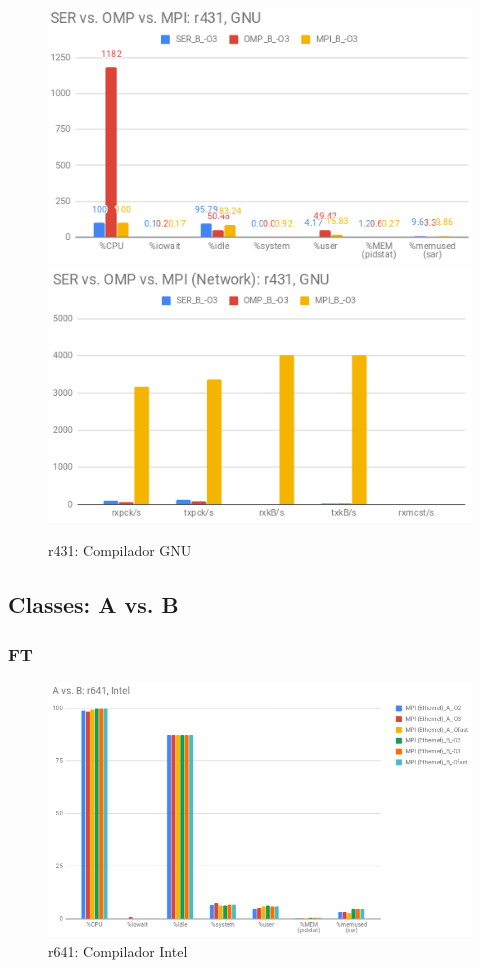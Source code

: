 \documentclass{article}
\begin{document}
\begin{appendices}
\begin{figure}[H]
    \centering
    \includegraphics[width=12cm]{Pictures/LUMZ_SER_OMP_MPI_r431_GNU_Comp.png}
    \includegraphics[width=12cm]{Pictures/LUMZ_SER_OMP_MPI_r431_GNU_Comm.png}
    \caption{r431: Compilador GNU}
    \label{fig:lumz_ser_omp_mpi_r431_gnu}
\end{figure}

\subsection{Classes: A vs. B}
\subsubsection{FT}

\begin{figure}[H]
    \centering
    \includegraphics[width=12cm]{Pictures/FT_A_B_r641_Intel.png}
    \caption{r641: Compilador Intel}
    \label{fig:ft_A_B_r641_intel}
\end{figure}


\end{appendices}
\end{document}

